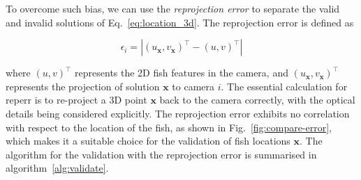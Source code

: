 \documentclass[11pt,twoside]{report}
\begin{document}

To overcome such bias, we can use the \emph{reprojection error} \cite{hartley2003} to separate the valid and invalid solutions of Eq.~\ref{eq:location_3d}. The reprojection error is defined as

\begin{equation}
	\epsilon_i	= \left\vert 
	( u_\mathbf{x}, v_\mathbf{x} )^\top
	- (u, v)^\top \right\vert
\label{eq:reproj-err}
\end{equation}

\noindent where $(u, v)^\top$ represents the 2D fish features in the camera, and $(u_\mathbf{x}, v_\mathbf{x})^\top$ represents the projection of solution $\mathbf{x}$ to camera $i$. The essential calculation for \gls{reperr} is to re-project a 3D point $\mathbf{x}$ back to the camera correctly, with the optical details being considered explicitly.
The reprojection error exhibits no correlation with respect to the location of the fish, as shown in Fig.~\ref{fig:compare-error}, which makes it a suitable choice for the validation of fish locations $\mathbf{x}$. The algorithm for the validation with the reprojection error is summarised in algorithm~\ref{alg:validate}.
\end{document}
